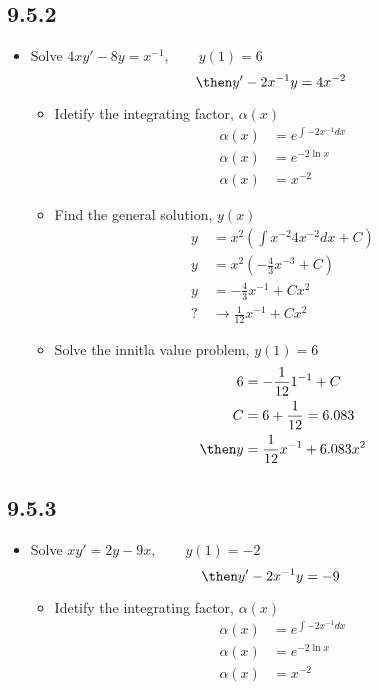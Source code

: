 \begin{itemize}
  \subsection{9.5.2}
  \begin{itemize}
    \item Solve \(4xy' - 8y = x^{-1}, \qquad y(1) = 6\)
      \[%
      \then y' - 2x^{-1}y = 4x^{-2}
      \]%
      \begin{itemize}
        \item Idetify the integrating factor, \(\alpha(x)\)
          \begin{align*}
            \alpha(x) &= e^{\int -2x^{-1} dx} \\
            \alpha(x) &= e^{-2\ln x} \\
            \alpha(x) &= x^{-2}
          \end{align*}

        \item Find the general solution, \(y(x)\)
          \begin{align*}
            y &= x^{2} \left( \int  x^{-2} 4x^{-2} dx + C \right) \\
            y &= x^{2} \left( -\frac{4}{3}x^{-3}  + C \right) \\
            y &= -\frac{4}{3}x^{-1} + Cx^{2} \\
            \text{?}~&\to\frac{1}{12}x^{-1} + Cx^2
          \end{align*}

        \item Solve the innitla value problem, \(y(1) = 6\)
          \begin{align*}
            6 &= -\frac{1}{12}1^{-1} + C  \\
            C &= 6+\frac{1}{12} = 6.083 \\
            \then
            y &= \frac{1}{12}x^{-1} + 6.083x^2
          \end{align*}
      \end{itemize}
  \end{itemize}

  \subsection{9.5.3}
  \begin{itemize}
    \item Solve \(xy' = 2y - 9x, \qquad y(1) = -2\)
      \[%
      \then y' - 2x^{-1}y = -9
      \]%
      \begin{itemize}
        \item Idetify the integrating factor, \(\alpha(x)\)
          \begin{align*}
            \alpha (x) &= e^{\int -2x^{-1} dx} \\
            \alpha (x) &= e^{-2 \ln  x} \\
            \alpha (x) &= x^{-2}
          \end{align*}


\end{itemize}
\end{itemize}
\end{itemize}

